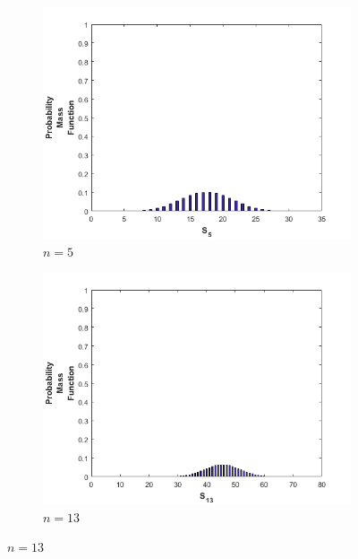 \documentclass[11pt]{article}
\theoremstyle{definition}
\theoremstyle{lemma}
\theoremstyle{remark}
\begin{document}
\begin{figure}[h!]
		\begin{subfigure}[h!]{0.48\textwidth}
			\includegraphics[width=\textwidth]{./Images/7/5.png}
			\caption{ $n=5$ }
		\end{subfigure}
		\quad
		\begin{subfigure}[h!]{0.48\textwidth}
			\includegraphics[width=\textwidth]{./Images/7/13.png}
			\caption{ $n=13$ }
		\end{subfigure}
	

\end{figure}
\end{document}
